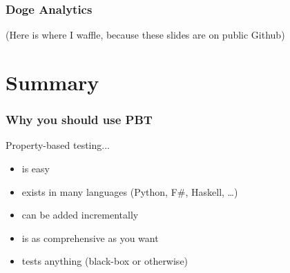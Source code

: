 \documentclass{beamer}
\begin{document}
\begin{frame}
\frametitle{Doge Analytics}

(Here is where I waffle, because these slides are on public Github)
\end{frame}

\section*{Summary}
\begin{frame}
\frametitle{Why you should use PBT}
Property-based testing...
\begin{itemize}
\item is easy
\item exists in many languages (Python, F\#, Haskell, \dots)
\item can be added incrementally
\item is as comprehensive as you want
\item tests anything (black-box or otherwise)
\end{itemize}
\end{frame}
\end{document}
